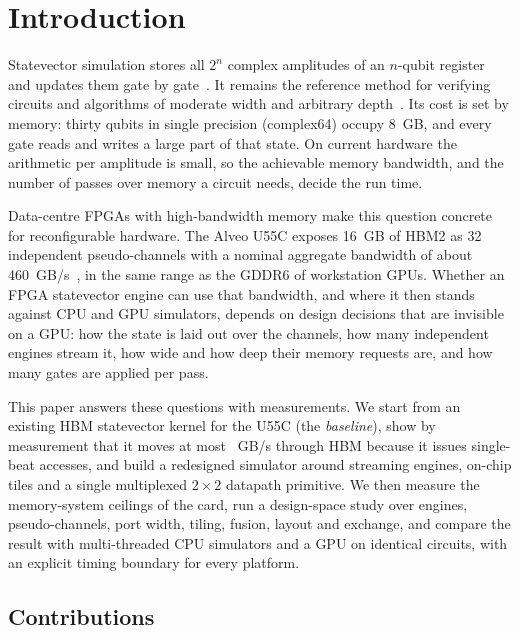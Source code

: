 \section{Introduction}\label{sec:introduction}

Statevector simulation stores all $2^n$ complex amplitudes of an $n$-qubit register and updates them gate by gate~\cite{nielsen2010quantum}. It remains the reference method for verifying circuits and algorithms of moderate width and arbitrary depth~\cite{preskill2018quantum,arute2019quantum}. Its cost is set by memory: thirty qubits in single precision (complex64) occupy 8~GB, and every gate reads and writes a large part of that state. On current hardware the arithmetic per amplitude is small, so the achievable memory bandwidth, and the number of passes over memory a circuit needs, decide the run time.

Data-centre FPGAs with high-bandwidth memory make this question concrete for reconfigurable hardware. The Alveo U55C exposes 16~GB of HBM2 as 32 independent pseudo-channels with a nominal aggregate bandwidth of about 460~GB/s~\cite{xilinx2023alveo}, in the same range as the GDDR6 of workstation GPUs. Whether an FPGA statevector engine can use that bandwidth, and where it then stands against CPU and GPU simulators, depends on design decisions that are invisible on a GPU: how the state is laid out over the channels, how many independent engines stream it, how wide and how deep their memory requests are, and how many gates are applied per pass.

This paper answers these questions with measurements. We start from an existing HBM statevector kernel for the U55C (the \emph{baseline}), show by measurement that it moves at most \NumVsevenBwMax~GB/s through HBM because it issues single-beat accesses, and build a redesigned simulator around streaming engines, on-chip tiles and a single multiplexed $2\times 2$ datapath primitive. We then measure the memory-system ceilings of the card, run a design-space study over engines, pseudo-channels, port width, tiling, fusion, layout and exchange, and compare the result with multi-threaded CPU simulators and a GPU on identical circuits, with an explicit timing boundary for every platform.

\subsection{Contributions}\label{subsec:contributions}

